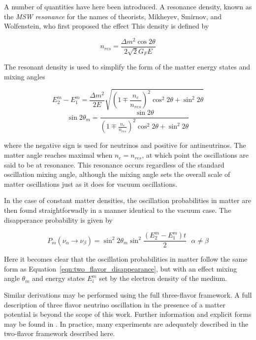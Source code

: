 A number of quantities have here been introduced. 
A resonance density, known as the \emph{MSW resonance} for the names of theorists, Mikheyev, Smirnov, and Wolfenstein, who first proposed the effect
This density is defined by 

\begin{equation}
n_{res} = \frac{\Delta m^2 \cos 2 \theta}{2 \sqrt{2} G_F E}
\end{equation}

The resonant density is used to simplify the form of the matter energy states and mixing angles

\begin{equation}
E_2^m - E_1^m = \frac{\Delta m^2}{2 E} \sqrt{\left(1 \mp \frac{n_e}{n_{res}}\right)^2 \cos^2 2 \theta + \sin^2 2 \theta}
\end{equation}
\begin{equation}
\sin 2 \theta_m = \frac{\sin 2 \theta}{\left(1 \mp \frac{n_e}{n_{res}}\right)^2 \cos^2 2 \theta + \sin^2 2 \theta}
\end{equation}

where the negative sign is used for neutrinos and positive for antineutrinos.
The matter angle reaches maximal when $n_e = n_{res}$, at which point the oscillations are said to be at resonance.
This resonance occurs regardless of the standard oscillation mixing angle, although the mixing angle sets the overall scale of matter oscillations just as it does for vacuum oscillations.

In the case of constant matter densities, the oscillation probabilities in matter are then found straightforwadly in a manner identical to the vacuum case.
The disapperance probability is given by

\begin{equation}
P_m \left( \nu_\alpha \rightarrow \nu_\beta \right) = \sin^2 2 \theta_m \sin^2 \frac{\left( E_2^m - E_1^m\right) t}{2} \ \ \ \alpha \neq \beta
\label{eqn:twoflavor_msw}
\end{equation}

Here it becomes clear that the oscillation probabilities in matter follow the same form as Equation~\ref{eqn:two_flavor_disappearance}, but with an effect mixing angle $\theta_m$ and energy states $E_i^m$ set by the electron density of the medium.

Similar derivations may be performed using the full three-flavor framework. 
A full description of three flavor neutrino oscillation in the presence of a matter potential is beyond the scope of this work.
Further information and explicit forms may be found in \cite{Barger-Oscillations, Review-PMNS}.
In practice, many experiments are adequately described in the two-flavor framework described here.

